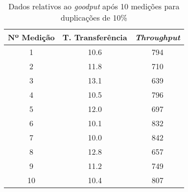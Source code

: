 \begin{table}[!ht]
\centering

\begin{tabular}{c c c}
\toprule
\toprule
	Nº Medição & T. Transferência & \emph{Throughput} \\ 
\midrule
1 & 10.6 & 794\\
2 & 11.8 & 710\\
3 & 13.1 & 639\\
4 & 10.5 & 796\\
5 & 12.0 & 697\\
6 & 10.1 & 832\\
7 & 10.0 & 842\\
8 & 12.8 & 657\\
9 & 11.2 & 749\\
10 & 10.4 & 807\\
\bottomrule
\end{tabular}
\caption{Dados relativos ao \emph{goodput} após 10 medições para duplicações de 10\%}
\label{tab:dup10}
\end{table}
